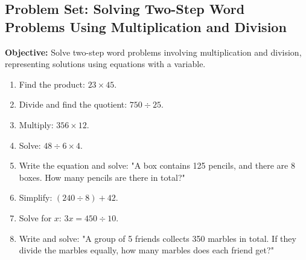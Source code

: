 \documentclass[12pt]{article}
\title{}
\date{}
\begin{document}
\subsection*{Problem Set: Solving Two-Step Word Problems Using Multiplication and Division}
\onehalfspacing

\begin{tcolorbox}[colframe=black!40, colback=gray!5, 
coltitle=black, colbacktitle=black!20, fonttitle=\bfseries\Large, 
title=Learning Objective, halign title=center, left=5pt, right=5pt, top=5pt, bottom=15pt]
\textbf{Objective:} Solve two-step word problems involving multiplication and division, representing solutions using equations with a variable.
\end{tcolorbox}

\begin{tcolorbox}[colframe=black!60, colback=white, 
coltitle=black, colbacktitle=black!15, fonttitle=\bfseries\Large, 
title=Exercises, halign title=center, left=10pt, right=10pt, top=10pt, bottom=60pt]
\begin{enumerate}[itemsep=3em]
    \item Find the product: \( 23 \times 45 \).
    \item Divide and find the quotient: \( 750 \div 25 \).
    \item Multiply: \( 356 \times 12 \).
    \item Solve: \( 48 \div 6 \times 4 \).
    \item Write the equation and solve: "A box contains 125 pencils, and there are 8 boxes. How many pencils are there in total?"
    \item Simplify: \( (240 \div 8) + 42 \).
    \item Solve for \( x \): \( 3x = 450 \div 10 \).
    \item Write and solve: "A group of 5 friends collects 350 marbles in total. If they divide the marbles equally, how many marbles does each friend get?"
\end{enumerate}
\end{tcolorbox}

\vspace{1em}
\end{document}
